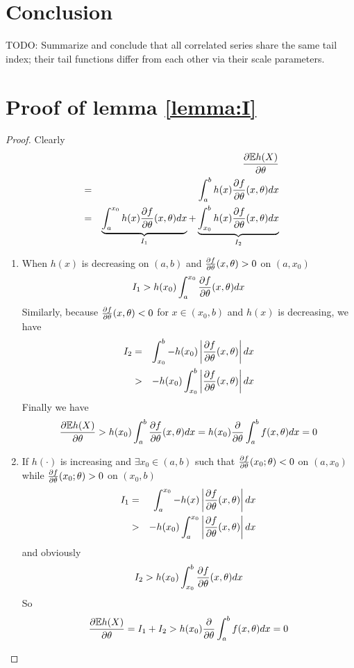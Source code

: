 \documentclass{article}
\begin{document}
\section{Conclusion}
TODO: Summarize and conclude that all correlated series share the same
tail index; their tail functions differ from each other via their
scale parameters.

\appendix
\section{Proof of lemma \ref{lemma:I}}
\begin{proof}
  Clearly
  \begin{eqnarray*}
    && \frac{\partial \mathbb{E} h(X)}{\partial \theta} \\
    &=& \int_a^b h(x) \frac{\partial f}{\partial \theta}(x, \theta) dx \\
    &=& \underbrace{\int_a^{x_0} h(x) \frac{\partial f}{\partial \theta}(x, \theta) dx}_{I_1}
    + \underbrace{\int_{x_0}^b h(x) \frac{\partial f}{\partial \theta}(x, \theta) dx}_{I_2}
  \end{eqnarray*}
  \begin{enumerate}
  \item When $h(x)$ is decreasing on $(a, b)$ and $\frac{\partial f}{\partial \theta}(x,
    \theta) > 0$ on $(a, x_0)$
    \[
    I_1 > h(x_0) \int_a^{x_0} \frac{\partial f}{\partial \theta}(x, \theta) dx
    \]
    Similarly, because $\frac{\partial f}{\partial \theta}(x, \theta) < 0$ for $x \in (x_0, b)$ and
    $h(x)$ is decreasing, we have
    \begin{eqnarray*}
      I_2 &=& \int_{x_0}^b -h(x_0)
      \left|\frac{\partial f}{\partial \theta}(x, \theta) \right| dx \\
      &>& -h(x_0)
      \int_{x_0}^b \left| 
        \frac{\partial f}{\partial \theta}(x, \theta)
      \right| dx
    \end{eqnarray*}
    Finally we have
    \begin{eqnarray*}
      \frac{\partial \mathbb{E} h(X)}{\partial \theta}
      > h(x_0) \int_a^b \frac{\partial f}{\partial \theta}(x, \theta) dx
      = h(x_0) \frac{\partial}{\partial \theta} \int_a^b f(x, \theta) dx
      = 0
    \end{eqnarray*}
  \item If $h(\cdot)$ is increasing and $\exists x_0 \in (a, b)$ such that 
    $\frac{\partial f}{\partial \theta}(x_0; \theta) < 0$ on $(a, x_0)$  while
    $\frac{\partial f}{\partial \theta}(x_0; \theta) > 0$ on $(x_0, b)$
    \begin{eqnarray*}
      I_1 &=&
      \int_a^{x_0} -h(x)
      \left| \frac{\partial f}{\partial \theta}(x, \theta) \right| dx \\
      &>&
      -h(x_0) \int_a^{x_0}
      \left| \frac{\partial f}{\partial \theta}(x, \theta) \right| dx
    \end{eqnarray*}
    and obviously
    \[
    I_2 > h(x_0) \int_{x_0}^b
    \frac{\partial f}{\partial \theta}(x, \theta) dx
    \]
    So
    \[
    \frac{\partial \mathbb{E} h(X)}{\partial \theta}
    = I_1 + I_2
    > h(x_0) \frac{\partial}{\partial \theta} \int_a^b f(x, \theta) dx = 0
    \]
  \end{enumerate}
\end{proof}
\end{document}
